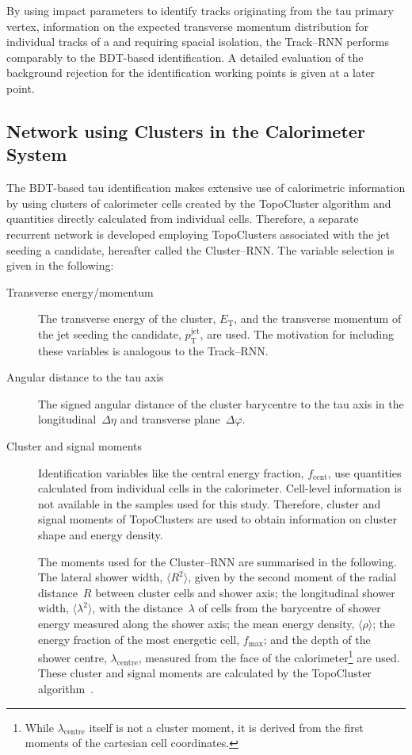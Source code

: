 By using impact parameters to identify tracks originating from the tau primary
vertex, information on the expected transverse momentum distribution for
individual tracks of a \tauhadvis and requiring spacial isolation, the
Track--RNN performs comparably to the BDT-based identification. A detailed
evaluation of the background rejection for the identification working points is
given at a later point.

\subsection{Network using Clusters in the Calorimeter System}
\label{sec:rnn_clusters}

The BDT-based tau identification makes extensive use of calorimetric information
by using clusters of calorimeter cells created by the TopoCluster algorithm and
quantities directly calculated from individual cells. Therefore, a separate
recurrent network is developed employing TopoClusters associated with the jet
seeding a \tauhadvis candidate, hereafter called the Cluster--RNN. The variable
selection is given in the following:
\begin{description}
\item[Transverse energy/momentum] The transverse energy of the cluster,
  $E_\text{T}$, and the transverse momentum of the jet seeding the \tauhadvis
  candidate, $p_\text{T}^\text{jet}$, are used. The motivation for including
  these variables is analogous to the Track--RNN.

\item[Angular distance to the tau axis] The signed angular distance of the
  cluster barycentre to the tau axis in the longitudinal~$\Delta \eta$ and
  transverse plane~$\Delta \varphi$.

\item[Cluster and signal moments] Identification variables like the central
  energy fraction, $f_\text{cent}$, use quantities calculated from individual
  cells in the calorimeter. Cell-level information is not available in the
  samples used for this study. Therefore, cluster and signal moments of
  TopoClusters are used to obtain information on cluster shape and energy
  density.

  The moments used for the Cluster--RNN are summarised in the following. The
  lateral shower width, $\langle R^2 \rangle$, given by the second moment of the
  radial distance~$R$ between cluster cells and shower axis; the longitudinal
  shower width, $\langle \lambda^2 \rangle$, with the distance~$\lambda$ of
  cells from the barycentre of shower energy measured along the shower axis; the
  mean energy density, $\langle \rho \rangle$; the energy fraction of the most
  energetic cell, $f_\text{max}$; and the depth of the shower centre,
  $\lambda_\text{centre}$, measured from the face of the
  calorimeter\footnote{While $\lambda_\text{centre}$ itself is not a cluster
    moment, it is derived from the first moments of the cartesian cell
    coordinates.} are used. These cluster and signal moments are calculated by
  the TopoCluster algorithm~\cite{atlas_topoclustering}.
\end{description}
